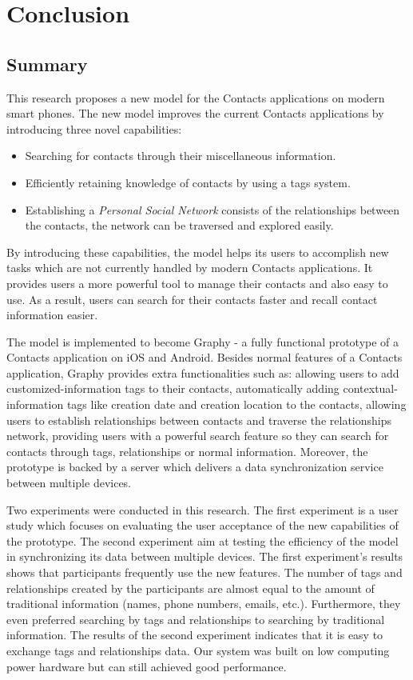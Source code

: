 \chapter{Conclusion}
\section{Summary}
This research proposes a new model for the Contacts applications on modern smart phones. The new model improves the current Contacts applications by introducing three novel capabilities:

\begin{itemize}
    \item {Searching for contacts through their miscellaneous information.}
    \item {Efficiently retaining knowledge of contacts by using a tags system.} 
    \item {Establishing a \textit{Personal Social Network} consists of the relationships between the contacts, the network can be traversed and explored easily.}
\end{itemize}

By introducing these capabilities, the model helps its users to accomplish new tasks which are not currently handled by modern Contacts applications. It provides users a more powerful tool to manage their contacts and also easy to use. As a result, users can search for their contacts faster and recall contact information easier.

The model is implemented to become Graphy - a fully functional prototype of a Contacts application on iOS and Android. Besides normal features of a Contacts application, Graphy provides extra functionalities such as: allowing users to add customized-information tags to their contacts, automatically adding contextual-information tags like creation date and creation location to the contacts, allowing users to establish relationships between contacts and traverse the relationships network, providing users with a powerful search feature so they can search for contacts through tags, relationships or normal information. Moreover, the prototype is backed by a server which delivers a data synchronization service between multiple devices.

Two experiments were conducted in this research. The first experiment is a user study which focuses on evaluating the user acceptance of the new capabilities of the prototype. The second experiment aim at testing the efficiency of the model in synchronizing its data between multiple devices. The first experiment's results shows that participants frequently use the new features. The number of tags and relationships created by the participants are almost equal to the amount of traditional information (names, phone numbers, emails, etc.). Furthermore, they even preferred searching by tags and relationships to searching by traditional information. The results of the second experiment indicates that it is easy to exchange tags and relationships data. Our system was built on low computing power hardware but can still achieved good performance.

